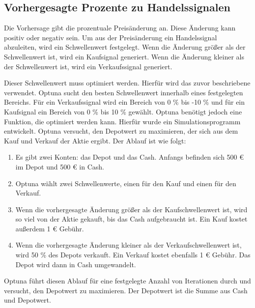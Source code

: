 \subsection{Vorhergesagte Prozente zu Handelssignalen}\label{sec: VorhergesagteProzentezuHandelssignale}
Die Vorhersage gibt die prozentuale Preisänderung an. Diese Änderung kann positiv oder negativ sein. Um aus der Preisänderung ein Handelssignal abzuleiten, wird ein Schwellenwert festgelegt. Wenn die Änderung größer als der Schwellenwert ist, wird ein Kaufsignal generiert. Wenn die Änderung kleiner als der Schwellenwert ist, wird ein Verkaufssignal generiert.
\par
Dieser Schwellenwert muss optimiert werden. Hierfür wird das zuvor beschriebene  verwendet. Optuna sucht den besten Schwellenwert innerhalb eines festgelegten Bereichs. Für ein Verkaufssignal wird ein Bereich von 0 \% bis -10 \% und für ein Kaufsignal ein Bereich von 0 \% bis 10 \% gewählt. Optuna benötigt jedoch eine Funktion, die optimiert werden kann. Hierfür wurde ein Simulationsprogramm entwickelt. Optuna versucht, den Depotwert zu maximieren, der sich aus dem Kauf und Verkauf der Aktie ergibt. Der Ablauf ist wie folgt:

\begin{enumerate}
    \item Es gibt zwei Konten: das Depot und das Cash. Anfangs befinden sich 500 € im Depot und 500 € in Cash.
    \item Optuna wählt zwei Schwellenwerte, einen für den Kauf und einen für den Verkauf.
    \item Wenn die vorhergesagte Änderung größer als der Kaufschwellenwert ist, wird so viel von der Aktie gekauft, bis das Cash aufgebraucht ist. Ein Kauf kostet außerdem 1 € Gebühr.
    \item Wenn die vorhergesagte Änderung kleiner als der Verkaufschwellenwert ist, wird 50 \% des Depots verkauft. Ein Verkauf kostet ebenfalls 1 € Gebühr. Das Depot wird dann in Cash umgewandelt.
\end{enumerate}

Optuna führt diesen Ablauf für eine festgelegte Anzahl von Iterationen durch und versucht, den Depotwert zu maximieren. Der Depotwert ist die Summe aus Cash und Depotwert.

